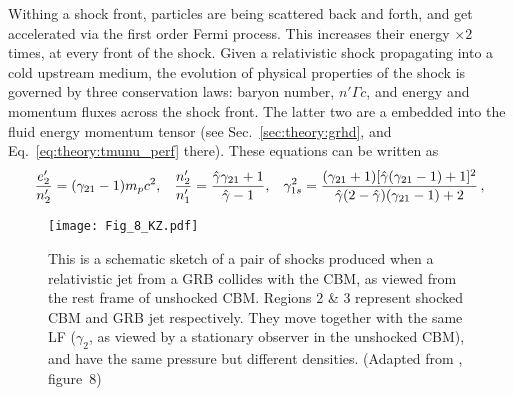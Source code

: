 %
Withing a shock front, particles are being scattered back and forth, and get accelerated 
via the first order Fermi process. This increases their energy ${\times}2$ 
times, at every front of the shock.
%
Given a relativistic shock propagating into a cold upstream medium, 
the evolution of physical properties of the shock is governed by three conservation
laws:  baryon number, $n' \Gamma c$, and energy and momentum fluxes across the shock front.
%
The latter two are a embedded into the fluid energy momentum tensor 
(see Sec.~\ref{sec:theory:grhd}, and Eq.~\ref{eq:theory:tmunu_perf} there).
%
These equations can be written as \citep{Blandford:1976,Rezzolla:2013} 
%
\begin{equation} %
\frac{e_2'}{n_2'} = (\gamma_{21} - 1)m_p c^2, \hspace{3mm}
\frac{n_2'}{n_1'} = \frac{\hat{\gamma}\gamma_{21} + 1}{\hat{\gamma}-1}, \hspace{3mm}
\gamma_{1s}^2 = \frac{(\gamma_{21} + 1) [\hat{\gamma}(\gamma_{21}-1)+1]^2}{\hat{\gamma}(2-\hat{\gamma})(\gamma_{21}-1)+2}\, ,
\label{eq:afterglow:blast}
\end{equation} %
%
\begin{figure*}[t]
    \centering 
    \texttt{[image: Fig\_8\_KZ.pdf]}
    \caption{
        This is a schematic sketch of a pair of shocks produced when a relativistic
        jet from a \ac{GRB} collides with the \ac{CBM}, as viewed from the
        rest frame of unshocked \ac{CBM}. Regions 2 \& 3 represent shocked \ac{CBM} and \ac{GRB}
        jet respectively. They move together with the same \ac{LF} ($\gamma_2$, as viewed
        by a stationary observer in the unshocked \ac{CBM}), and have the same pressure but
        different densities.
        (Adapted from \citet{Kumar:2014upa}, figure~8)
    }
    \label{fig:aafg:theory:sr8}
\end{figure*}

